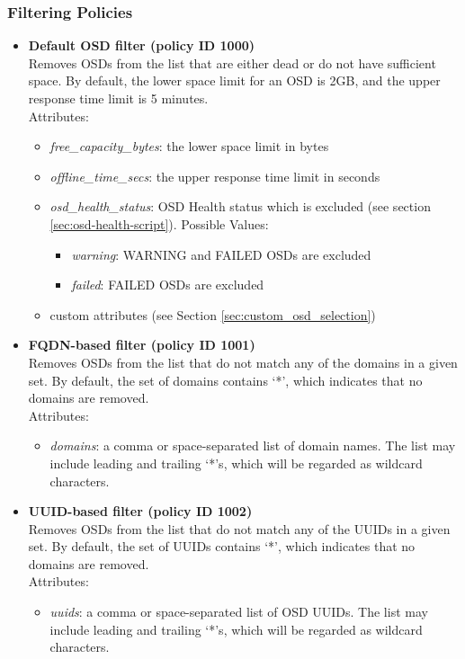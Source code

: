 \documentclass[a4paper,10pt]{book}
\begin{document}
\subsubsection{Filtering Policies}
\begin{itemize}

 \item \textbf{Default OSD filter (policy ID 1000)}\\
 Removes OSDs from the list that are either dead or do not have sufficient space. By default, the lower space limit for an OSD is 2GB, and the upper response time limit is 5 minutes.\\

 Attributes:
 \begin{itemize}
 \item \emph{free\_capacity\_bytes}: the lower space limit in bytes
 \item \emph{offline\_time\_secs}: the upper response time limit in seconds
 \item \emph{osd\_health\_status}: OSD Health status which is excluded (see section \ref{sec:osd-health-script}). Possible Values:
 \begin{itemize}
 \item \emph{warning}: WARNING and FAILED OSDs are excluded
 \item \emph{failed}: FAILED OSDs are excluded
 \end{itemize}
 \item custom attributes (see Section \ref{sec:custom_osd_selection})
 \end{itemize}

 \item \textbf{FQDN-based filter (policy ID 1001)}\\
 Removes OSDs from the list that do not match any of the domains in a given set. By default, the set of domains contains `*', which indicates that no domains are removed.\\

 Attributes:
 \begin{itemize}
 \item \emph{domains}: a comma or space-separated list of domain names. The list may include leading and trailing `*'s, which will be regarded as wildcard characters.
 \end{itemize}

 \item \textbf{UUID-based filter (policy ID 1002)}\\
 Removes OSDs from the list that do not match any of the UUIDs in a given set. By default, the set of UUIDs contains `*', which indicates that no domains are removed.\\

 Attributes:
 \begin{itemize}
 \item \emph{uuids}: a comma or space-separated list of OSD UUIDs. The list may include leading and trailing `*'s, which will be regarded as wildcard characters.
 \end{itemize}

\end{itemize}
\end{document}
